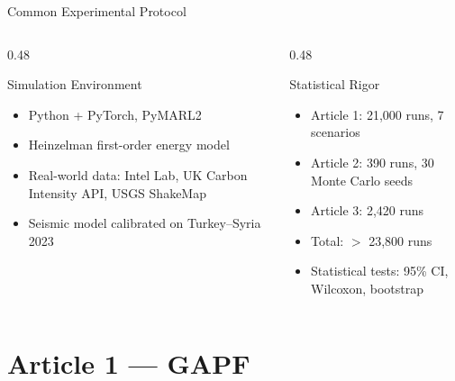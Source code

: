 \documentclass[10pt,aspectratio=169]{beamer}
\begin{document}
\begin{frame}{Common Experimental Protocol}
\begin{columns}[T]
\begin{column}{0.48\textwidth}
  \begin{block}{Simulation Environment}
    \begin{itemize}\small
      \item Python + PyTorch, PyMARL2
      \item Heinzelman first-order energy model
      \item Real-world data: Intel Lab, UK Carbon Intensity API, USGS ShakeMap
      \item Seismic model calibrated on Turkey--Syria 2023
    \end{itemize}
  \end{block}
\end{column}
\begin{column}{0.48\textwidth}
  \begin{block}{Statistical Rigor}
    \begin{itemize}\small
      \item Article 1: 21,000 runs, 7 scenarios
      \item Article 2: 390 runs, 30 Monte Carlo seeds
      \item Article 3: 2,420 runs
      \item Total: $>$ 23,800 runs
      \item Statistical tests: 95\% CI, Wilcoxon, bootstrap
    \end{itemize}
  \end{block}
\end{column}
\end{columns}
\end{frame}

\section{Article 1 --- GAPF}
\end{document}
